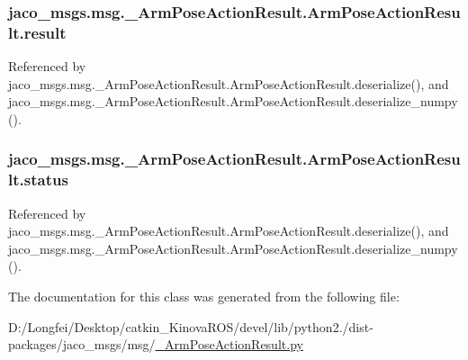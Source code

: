 \subsubsection[{\texorpdfstring{result}{result}}]{\setlength{\rightskip}{0pt plus 5cm}jaco\+\_\+msgs.\+msg.\+\_\+\+Arm\+Pose\+Action\+Result.\+Arm\+Pose\+Action\+Result.\+result}\hypertarget{classjaco__msgs_1_1msg_1_1__ArmPoseActionResult_1_1ArmPoseActionResult_a6debdadfdee3118c370d0a82f62c56ee}{}\label{classjaco__msgs_1_1msg_1_1__ArmPoseActionResult_1_1ArmPoseActionResult_a6debdadfdee3118c370d0a82f62c56ee}


Referenced by jaco\+\_\+msgs.\+msg.\+\_\+\+Arm\+Pose\+Action\+Result.\+Arm\+Pose\+Action\+Result.\+deserialize(), and jaco\+\_\+msgs.\+msg.\+\_\+\+Arm\+Pose\+Action\+Result.\+Arm\+Pose\+Action\+Result.\+deserialize\+\_\+numpy().

\subsubsection[{\texorpdfstring{status}{status}}]{\setlength{\rightskip}{0pt plus 5cm}jaco\+\_\+msgs.\+msg.\+\_\+\+Arm\+Pose\+Action\+Result.\+Arm\+Pose\+Action\+Result.\+status}\hypertarget{classjaco__msgs_1_1msg_1_1__ArmPoseActionResult_1_1ArmPoseActionResult_ab5014de96d390234ceea56bed94a106b}{}\label{classjaco__msgs_1_1msg_1_1__ArmPoseActionResult_1_1ArmPoseActionResult_ab5014de96d390234ceea56bed94a106b}


Referenced by jaco\+\_\+msgs.\+msg.\+\_\+\+Arm\+Pose\+Action\+Result.\+Arm\+Pose\+Action\+Result.\+deserialize(), and jaco\+\_\+msgs.\+msg.\+\_\+\+Arm\+Pose\+Action\+Result.\+Arm\+Pose\+Action\+Result.\+deserialize\+\_\+numpy().



The documentation for this class was generated from the following file\+:\begin{DoxyCompactItemize}
\item 
D\+:/\+Longfei/\+Desktop/catkin\+\_\+\+Kinova\+R\+O\+S/devel/lib/python2./dist-\/packages/jaco\+\_\+msgs/msg/\hyperlink{__ArmPoseActionResult_8py}{\+\_\+\+Arm\+Pose\+Action\+Result.\+py}\end{DoxyCompactItemize}
